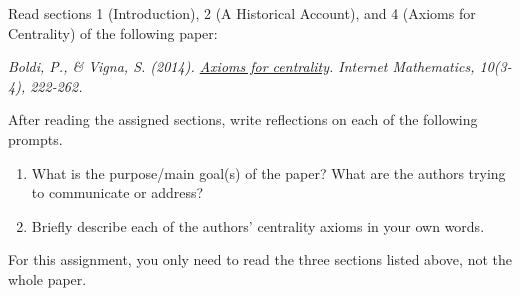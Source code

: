 \documentclass[11pt]{article}
\begin{document}
\begin{tcolorbox}[title = 5. Reading: Axioms of Centrality, parbox = false]
Read sections 1 (Introduction), 2 (A Historical Account), and 4 (Axioms for Centrality) of the following paper:

{\em
Boldi, P., \& Vigna, S. (2014). \href{https://arxiv.org/pdf/1308.2140}{Axioms for centrality}. Internet Mathematics, 10(3-4), 222-262.
}

After reading the assigned sections, write reflections on each of the following prompts.

\begin{enumerate}
    \item 
    What is the purpose/main goal(s) of the paper? What are the authors trying to communicate or address?
    \item 
    Briefly describe each of the authors' centrality axioms in your own words.
\end{enumerate}
For this assignment, you only need to read the three sections listed above, not the whole paper.
\end{tcolorbox}

\end{document}
